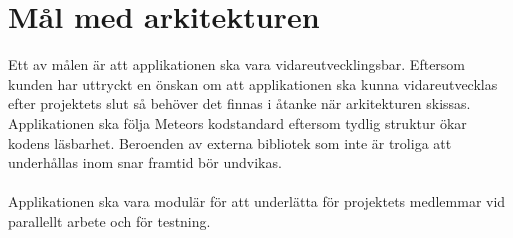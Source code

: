 \section{Mål med arkitekturen}
Ett av målen är att applikationen ska vara vidareutvecklingsbar. Eftersom kunden har uttryckt en önskan om att applikationen ska kunna vidareutvecklas efter projektets slut så behöver det finnas i åtanke när arkitekturen skissas. Applikationen ska följa Meteors kodstandard eftersom tydlig struktur ökar kodens läsbarhet.\cite{website:meteorcodestyle} Beroenden av externa bibliotek som inte är troliga att underhållas inom snar framtid bör undvikas.
\\ \\
Applikationen ska vara modulär för att underlätta för projektets medlemmar vid parallellt arbete och för testning.